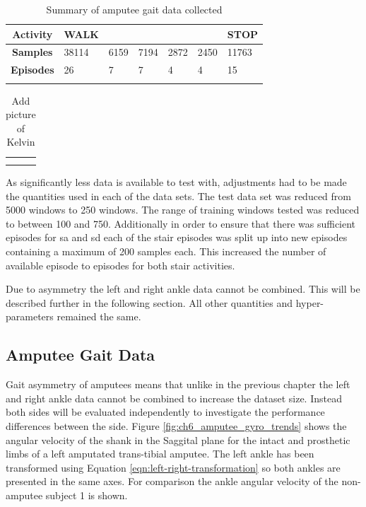 \begin{table}[hbt]
    \centering
    \caption{Summary of amputee gait data collected}
    \label{tab:summary-of-episode-amputee-data}
    \begin{tabularx}{\textwidth}{c *{6}{Y}}
        \textbf{Activity} & WALK &  &  &  &  & STOP \\
        \hline
        \textbf{Samples} & 38114 & 6159 & 7194 & 2872 & 2450 & 11763 \\
        \textbf{Episodes} & 26 & 7 & 7 & 4 & 4 & 15 \\
         \\
    \end{tabularx}
\end{table}

\begin{table}[hbt]
    \centering
    \begin{tabular}{c|c}
         &  \\
         & 
    \end{tabular}
    \caption{Add picture of Kelvin}
    \label{tab:my_label}
\end{table}

As significantly less data is available to test with, adjustments had to be made the quantities used in each of the data sets. The test data set was reduced from 5000 windows to 250 windows. The range of training windows tested was reduced to between 100 and 750. Additionally in order to ensure that there was sufficient episodes for \acrshort{sa} and \acrshort{sd} each of the stair episodes was split up into new episodes containing a maximum of 200 samples each. This increased the number of available episode to episodes for both stair activities. 

Due to asymmetry the left and right ankle data cannot be combined. This will be described further in the following section. All other quantities and hyper-parameters remained the same.

\subsection{Amputee Gait Data}
Gait asymmetry of amputees means that unlike in the previous chapter the left and right ankle data cannot be combined to increase the dataset size. Instead both sides will be evaluated independently to investigate the performance differences between the side. Figure \ref{fig:ch6_amputee_gyro_trends} shows the angular velocity of the shank in the Saggital plane for the intact and prosthetic limbs of a left amputated trans-tibial amputee. The left ankle has been transformed using Equation \ref{eqn:left-right-transformation} so both ankles are presented in the same axes. For comparison the ankle angular velocity of the non-amputee subject 1 is shown.

